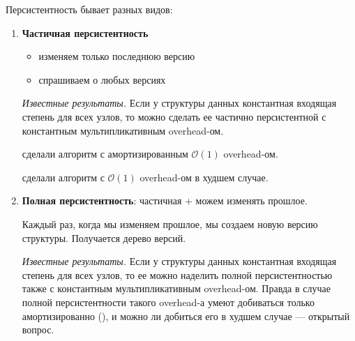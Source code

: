 Персистентность бывает разных видов:

\begin{enumerate}

\item {\bf Частичная персистентность}

\begin{itemize}

\item изменяем только последнюю версию
\item спрашиваем о любых версиях

\end{itemize}

\vspace{10pt}

{\it Известные результаты.} Если у структуры данных константная входящая степень для всех узлов, то можно сделать ее частично персистентной с константным мультипликативным overhead-ом.

\cite{driscoll1986making} сделали алгоритм с амортизированным $\mathcal{O}(1)$ overhead-ом.

\cite{brodal1996partially} сделали алгоритм с $\mathcal{O}(1)$ overhead-ом в худшем случае.

\item {\bf Полная персистентность}: частичная + можем изменять прошлое.

Каждый раз, когда мы изменяем прошлое, мы создаем новую версию структуры. Получается дерево версий.

\vspace{5pt}

{\it Известные результаты.} Если у структуры данных константная входящая степень для всех узлов, то ее можно наделить полной персистентностью также с константным мультипликативным overhead-ом. Правда в случае полной персистентности такого overhead-а умеют добиваться только амортизированно (\cite{driscoll1986making}), и можно ли добиться его в худшем случае --- открытый вопрос.  


\end{enumerate}
